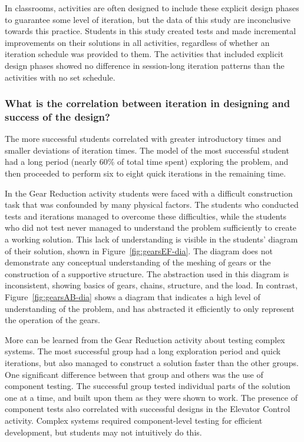 	In classrooms, activities are often designed to include these explicit design phases to guarantee some level of iteration, but the data of this study are inconclusive towards this practice. Students in this study created tests and made incremental improvements on their solutions in all activities, regardless of whether an iteration schedule was provided to them. The activities that included explicit design phases showed no difference in session-long iteration patterns than the activities with no set schedule. 
	
\subsubsection{What is the correlation between iteration in designing and success of the design?}
	The more successful students correlated with greater introductory times and smaller deviations of iteration times. The model of the most successful student had a long period (nearly 60\% of total time spent) exploring the problem, and then proceeded to perform six to eight quick iterations in the remaining time. 
	
	In the Gear Reduction activity students were faced with a difficult construction task that was confounded by many physical factors. The students who conducted tests and iterations managed to overcome these difficulties, while the students who did not test never managed to understand the problem sufficiently to create a working solution. This lack of understanding is visible in the students' diagram of their solution, shown in Figure~\ref{fig:gearsEF-dia}. The diagram does not demonstrate any conceptual understanding of the meshing of gears or the construction of a supportive structure. The abstraction used in this diagram is inconsistent, showing basics of gears, chains, structure, and the load.  In contrast, Figure~\ref{fig:gearsAB-dia} shows a diagram that indicates a high level of understanding of the problem, and has abstracted it efficiently to only represent the operation of the gears.
	
	More can be learned from the Gear Reduction activity about testing complex systems. The most successful group had a long exploration period and quick iterations, but also managed to construct a solution faster than the other groups. One significant difference between that group and others was the use of component testing. The successful group tested individual parts of the solution one at a time, and built upon them as they were shown to work. The presence of component tests also correlated with successful designs in the Elevator Control activity. Complex systems required component-level testing for efficient development, but students may not intuitively do this. 

